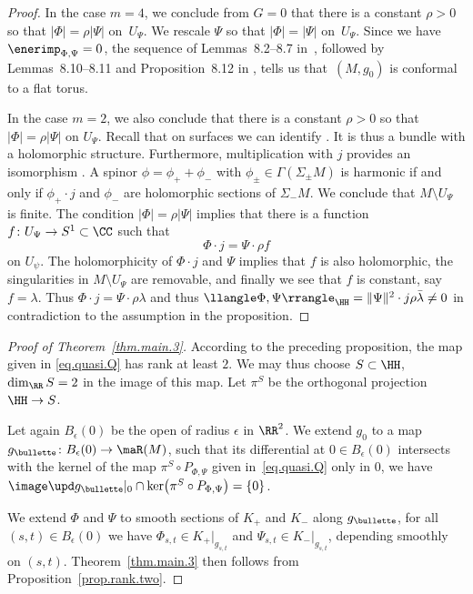 \begin{proof}
In the case $m=4$, we conclude from $G=0$ that there is a constant $\rho>0$ so that $|\Phi|=\rho|\Psi|$ on~$U_\Psi$. We rescale $\Psi$ so that $|\Phi|=|\Psi|$ on~$U_\Psi$. Since we have $\enerimp_{\Phi,\Psi} = 0$, the sequence of Lem\-mas~8.2--8.7 in~\cite{maier:97}, followed by Lemmas~8.10--8.11 and Proposition~8.12 in \cite{maier:97}, tells us that~$(M,g_0)$ is conformal to a flat torus.

In the case $m=2$, we also conclude that there is a constant $\rho>0$ so that $|\Phi|=\rho|\Psi|$ on $U_\Psi$. Recall that on surfaces we can identify . It is thus a bundle with a holomorphic structure. Furthermore, multiplication with $j$ provides an isomorphism . A spinor $\phi=\phi_++\phi_-$ with $\phi_\pm\in \Gamma(\Sigma_\pm M)$ is harmonic if and only if $\phi_+ \cdot j $ and $\phi_-$ are holomorphic sections of $\Sigma_-M$. We conclude that $M\setminus U_\Psi$ is finite. The condition $|\Phi|=\rho|\Psi|$ implies that there is a function $f\colon U_\Psi\to S^1\subset \CC$ such that
\[
\Phi\cdot j = \Psi\cdot \rho f
\]
on $U_\psi$. The holomorphicity of $\Phi\cdot j $ and $\Psi$ implies that $f$ is also holomorphic, the singularities in $M\setminus U_\Psi$ are removable, and finally we see that $f$ is constant, say $f=\lambda$. Thus $\Phi\cdot j = \Psi\cdot\rho \lambda$ and thus $\llangle\Phi,\Psi\rrangle_\HH = \|\Psi\|^2\cdot j\rho \bar\lambda\neq 0$ in contradiction to the assumption in the proposition.
\end{proof}

\begin{proof}[Proof of Theorem~\ref{thm.main.3}]
According to the preceding proposition, the map given in \eqref{eq.quasi.Q} has rank at least $2$. We may thus choose $S\subset \HH$, $\dim_\RR S=2$ in the image of this map.
Let $\pi^S$ be the orthogonal projection $\HH\to S$.

Let again $B_\epsilon(0)$ be the open \ball{} of radius $\epsilon$ in $\RR^2$. We extend $g_0$ to a map $g_{\bullette}\colon B_\epsilon(0)\to \maR(M)$, such that its differential at $0\in B_\epsilon(0)$ intersects with the kernel of the map $\pi^S\circ P_{\Phi,\Psi}$ given in~\eqref{eq.quasi.Q} only in $0$, \ie we have $\image \upd g_{\bullette}|_{0}\cap \ker \bigl(\pi^S\circ P_{\Phi,\Psi}\bigr)=\{0\}$.

We extend $\Phi$ and $\Psi$ to smooth sections of $K_+$ and $K_-$ along $g_\bullette$, \ie for all $(s,t)\in B_\epsilon(0)$ we have $\Phi_{s,t}\in K_+|_{g_{s,t}}$ and $\Psi_{s,t}\in K_-|_{g_{s,t}} $, depending smoothly on $(s,t)$. Theorem~\ref{thm.main.3} then follows from Proposition~\ref{prop.rank.two}.
\end{proof}

